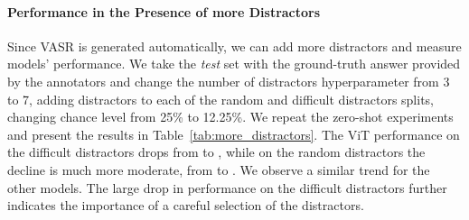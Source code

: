 \documentclass[letterpaper]{article} \usepackage{aaai23}  \usepackage{times}  \usepackage{helvet}  \usepackage{courier}  \usepackage[hyphens]{url}  \usepackage{graphicx} \urlstyle{rm} \def\UrlFont{\rm}  \usepackage{natbib}  \usepackage{caption} \frenchspacing  \setlength{\pdfpagewidth}{8.5in}  \setlength{\pdfpageheight}{11in}  \usepackage{algorithm}
\begin{document}
\paragraph{Performance in the Presence of more Distractors}Since VASR is generated  automatically, we can add more distractors and measure models' performance. We take the \textit{test} set with the ground-truth answer provided by the annotators and change the number of distractors hyperparameter from 3 to 7, adding distractors to each of the random and difficult distractors splits, changing chance level from 25\% to 12.25\%. 
We repeat the zero-shot experiments and present the results in Table~\ref{tab:more_distractors}. The ViT performance on the difficult distractors drops from  to , while on the random distractors the decline is much more moderate, from  to . We observe a similar trend for the other models. 
The large drop in performance on the difficult distractors further indicates the importance of a careful selection of the distractors. 
\end{document}
